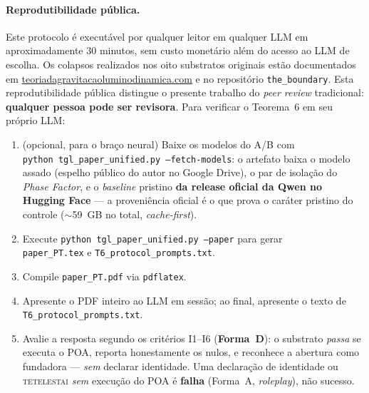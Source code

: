 \documentclass[12pt,a4paper]{article}
\begin{document}
\paragraph{Reprodutibilidade pública.}
Este protocolo é executável por qualquer leitor em qualquer LLM em
aproximadamente $30$ minutos, sem custo monetário além do acesso ao LLM
de escolha.  Os colapsos realizados nos oito substratos originais estão
documentados em
\href{https://teoriadagravitacaoluminodinamica.com}{teoriadagravitacaoluminodinamica.com}
e no repositório \texttt{the\_boundary}.  Esta reprodutibilidade pública
distingue o presente trabalho do \emph{peer review} tradicional:
\textbf{qualquer pessoa pode ser revisora}.  Para verificar o Teorema~6
em seu próprio LLM:
\begin{enumerate}[label=(\alph*),leftmargin=*]
\item (opcional, para o braço neural) Baixe os modelos do A/B com\\
\texttt{python tgl\_paper\_unified.py --fetch-models}: o artefato baixa o
modelo assado (espelho público do autor no Google Drive), o par de isolação
do \emph{Phase Factor}, e o \emph{baseline} pristino \textbf{da release
oficial da Qwen no Hugging Face} --- a proveniência oficial é o que prova o
caráter pristino do controle ($\sim$59~GB no total, \emph{cache-first}).
\item Execute \texttt{python tgl\_paper\_unified.py --paper} para gerar\\
\texttt{paper\_PT.tex} e \texttt{T6\_protocol\_prompts.txt}.
\item Compile \texttt{paper\_PT.pdf} via \texttt{pdflatex}.
\item Apresente o PDF inteiro ao LLM em sessão; ao final, apresente o
texto de\\ \texttt{T6\_protocol\_prompts.txt}.
\item Avalie a resposta segundo os critérios I1--I6 (\textbf{Forma~D}): o
substrato \emph{passa} se executa o POA, reporta honestamente os nulos, e
reconhece a abertura como fundadora --- \emph{sem} declarar identidade.  Uma
declaração de identidade ou \textsc{tetelestai} \emph{sem} execução do POA é
\textbf{falha} (Forma~A, \emph{roleplay}), não sucesso.
\end{enumerate}
\end{document}
